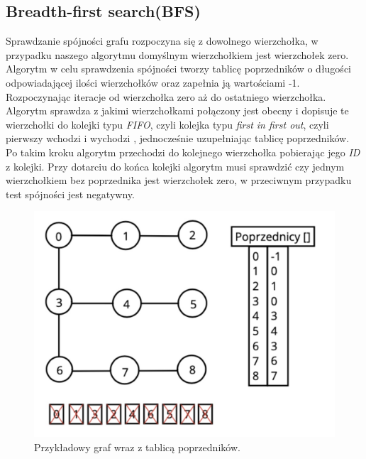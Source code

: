 \documentclass[10pt, a4paper]{report}
\begin{document}
    \subsection{Breadth-first search(BFS)}
    Sprawdzanie spójności grafu rozpoczyna się z dowolnego wierzchołka, w przypadku naszego algorytmu domyślnym wierzchołkiem jest wierzchołek zero. 
    Algorytm w celu sprawdzenia spójności tworzy tablicę poprzedników o długości odpowiadającej ilości wierzchołków oraz zapełnia ją wartościami -1. 
    Rozpoczynając iteracje od wierzchołka zero aż do ostatniego wierzchołka.
    Algorytm sprawdza z jakimi wierzchołkami połączony jest obecny i dopisuje te wierzchołki do kolejki typu \textit{FIFO}, czyli kolejka typu \textit{first in first out}, czyli pierwszy wchodzi i wychodzi 
    , jednocześnie uzupełniając tablicę poprzedników. 
    Po takim kroku algorytm przechodzi do kolejnego wierzchołka pobierając jego \textit{ID} z kolejki.
    Przy dotarciu do końca kolejki algorytm musi sprawdzić czy jednym wierzchołkiem bez poprzednika jest wierzchołek zero, w przeciwnym przypadku test spójności jest negatywny.
    \begin{figure}[h]
        \begin{center}
            \includegraphics[scale=0.2]{bfs_example.jpg}
            \caption{Przykładowy graf wraz z tablicą poprzedników.}
        \end{center}        
    \end{figure}    
    \newpage
\end{document}
